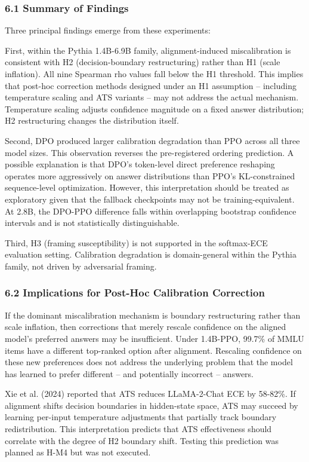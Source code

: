 
\subsubsection{6.1 Summary of Findings}

Three principal findings emerge from these experiments:

First, within the Pythia 1.4B-6.9B family, alignment-induced miscalibration is consistent with H2 (decision-boundary restructuring) rather than H1 (scale inflation). All nine Spearman rho values fall below the H1 threshold. This implies that post-hoc correction methods designed under an H1 assumption -- including temperature scaling and ATS variants -- may not address the actual mechanism. Temperature scaling adjusts confidence magnitude on a fixed answer distribution; H2 restructuring changes the distribution itself.

Second, DPO produced larger calibration degradation than PPO across all three model sizes. This observation reverses the pre-registered ordering prediction. A possible explanation is that DPO's token-level direct preference reshaping operates more aggressively on answer distributions than PPO's KL-constrained sequence-level optimization. However, this interpretation should be treated as exploratory given that the fallback checkpoints may not be training-equivalent. At 2.8B, the DPO-PPO difference falls within overlapping bootstrap confidence intervals and is not statistically distinguishable.

Third, H3 (framing susceptibility) is not supported in the softmax-ECE evaluation setting. Calibration degradation is domain-general within the Pythia family, not driven by adversarial framing.

\subsubsection{6.2 Implications for Post-Hoc Calibration Correction}

If the dominant miscalibration mechanism is boundary restructuring rather than scale inflation, then corrections that merely rescale confidence on the aligned model's preferred answers may be insufficient. Under 1.4B-PPO, 99.7\% of MMLU items have a different top-ranked option after alignment. Rescaling confidence on these new preferences does not address the underlying problem that the model has learned to prefer different -- and potentially incorrect -- answers.

Xie et al. (2024) reported that ATS reduces LLaMA-2-Chat ECE by 58-82\%. If alignment shifts decision boundaries in hidden-state space, ATS may succeed by learning per-input temperature adjustments that partially track boundary redistribution. This interpretation predicts that ATS effectiveness should correlate with the degree of H2 boundary shift. Testing this prediction was planned as H-M4 but was not executed.

